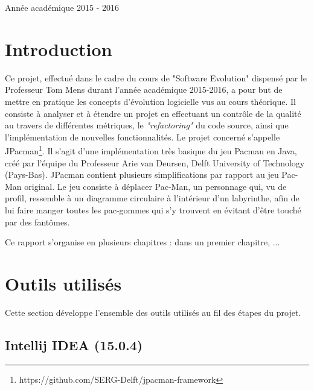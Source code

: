 \documentclass[12pt, openany]{report}
\begin{document}
\begin{titlepage}
\begin{sffamily}
\begin{center}
    \vfill

    {\large Année académique 2015 - 2016}
	
  \end{center}
  \end{sffamily}
\end{titlepage}




\newpage

	\renewcommand{\thesection}{\arabic{section}}
	\tableofcontents
	\newpage
	\setcounter{secnumdepth}{3}
	\setcounter{tocdepth}{4}
	

\section{Introduction}
Ce projet, effectué dans le cadre du cours de "Software Evolution" dispensé par le Professeur Tom Mens durant l'année académique 2015-2016, a pour but de mettre en pratique les concepts d'évolution logicielle vus au cours théorique. Il consiste à analyser et à étendre un projet en effectuant un contrôle de la qualité au travers de différentes métriques, le \textit{"refactoring"} du code source, ainsi que l'implémentation de nouvelles fonctionnalités. Le projet concerné s'appelle JPacman\footnote{https://github.com/SERG-Delft/jpacman-framework}. Il s'agit d'une implémentation très basique du jeu Pacman en Java, créé par l'équipe  du Professeur Arie van Deursen, Delft University of Technology (Pays-Bas).
 JPacman contient plusieurs simplifications par rapport au jeu Pac-Man original. Le jeu consiste à déplacer Pac-Man, un personnage qui, vu de profil, ressemble à un diagramme circulaire à l’intérieur d’un labyrinthe, afin de lui faire manger toutes les pac-gommes qui s’y trouvent en évitant d’être touché par des fantômes.
 
 Ce rapport s'organise en plusieurs chapitres : dans un premier chapitre, ...



\section{Outils utilisés}

Cette section développe l'ensemble des outils utilisés au fil des étapes du projet.

\subsection{Intellij IDEA (15.0.4)}
\end{document}
